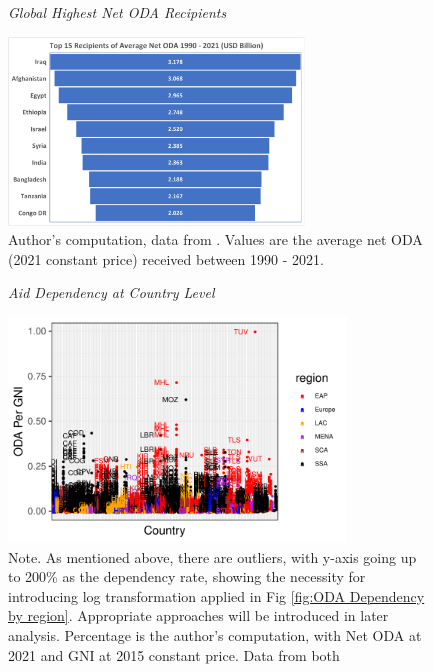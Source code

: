 \begin{figure}[H]
\captionsetup{justification=justified,singlelinecheck=false}
\caption{\textit{Global Highest Net ODA Recipients}}
    \centering \includegraphics[width = 0.7\textwidth]{Figures/ODA_Graphs/Top_10_ODA_recps.pdf}
    \caption*{\footnotesize{Author's computation, data from \textcite{oecd_Data_2023}. Values are the average net ODA (2021 constant price) received between  1990 - 2021.}}
    \label{fig:ODA highest recipient}
\end{figure}



\begin{figure}[H]
\caption{\textit{Aid Dependency at Country Level}}
    \centering \includegraphics[width = 0.8\textwidth]{Figures/ODA_Graphs/ODA_GNI_scatPlot.pdf}
    \caption*{\footnotesize{Note. As mentioned above, there are outliers, with y-axis going up to 200\% as the dependency rate, showing the necessity for introducing log transformation applied in Fig \ref{fig:ODA Dependency by region}. Appropriate approaches will be introduced in later analysis. Percentage is the author's computation, with Net ODA at 2021 and GNI at 2015 constant price. Data from both \textcite{oecd_Data_2023, wdi_world_2023}}}
    \label{fig:aid dependency}
\end{figure}


